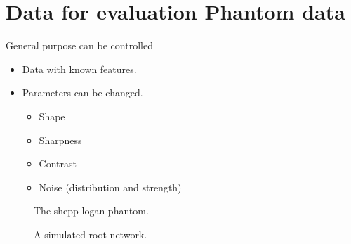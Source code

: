 \documentclass[letterpaper,10pt,english]{sphinxmanual}
\begin{document}
\section{Data for evaluation \sphinxhyphen{}  Phantom data}
\label{\detokenize{02-ImageEnhancement:data-for-evaluation-phantom-data}}
\sphinxAtStartPar
General purpose can be controlled
\begin{itemize}
\item {} 
\sphinxAtStartPar
Data with known features.

\item {} 
\sphinxAtStartPar
Parameters can be changed.
\begin{itemize}
\item {} 
\sphinxAtStartPar
Shape

\item {} 
\sphinxAtStartPar
Sharpness

\item {} 
\sphinxAtStartPar
Contrast

\item {} 
\sphinxAtStartPar
Noise (distribution and strength)

\end{itemize}

\end{itemize}



\begin{figure}[htbp]
\centering
\capstart

\noindent{}
\caption{The  shepp logan phantom.}\label{\detokenize{02-ImageEnhancement:id31}}\end{figure}

\begin{figure}[htbp]
\centering
\capstart

\noindent{}
\caption{A simulated root network.}\label{\detokenize{02-ImageEnhancement:id32}}\end{figure}
\end{document}
